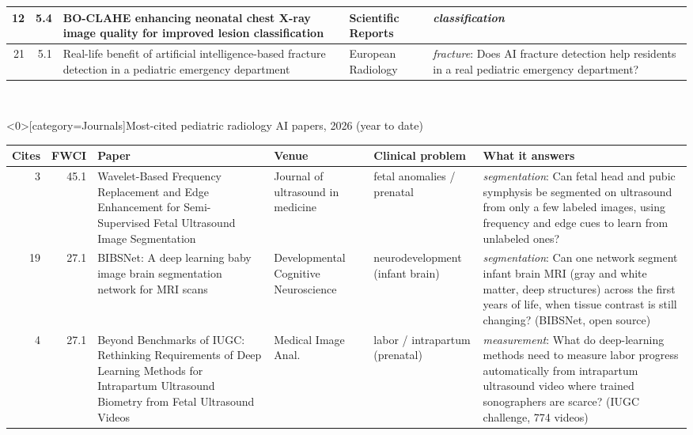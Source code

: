 \documentclass[aspectratio=169]{beamer}
\renewcommand{\arraystretch}{1.08}
\begin{document}
\begin{frame}
\begin{adjustbox}{max totalsize={\textwidth}{0.64\textheight}}
\begin{tabular}{|r|r|>{\raggedright\arraybackslash}p{}|>{\raggedright\arraybackslash}p{}|>{\raggedright\arraybackslash}p{}|}
12 & 5.4 & BO-CLAHE enhancing neonatal chest X-ray image quality for improved lesion classification & Scientific Reports & \textit{classification} \\ \hline
21 & 5.1 & Real-life benefit of artificial intelligence-based fracture detection in a pediatric emergency department & European Radiology & \textit{fracture}: Does AI fracture detection help residents in a real pediatric emergency department? \\ \hline
\end{tabular}
\end{adjustbox}
\\[1pt]
{\tiny }
\end{frame}

\begin{frame}<0>[category=Journals]{Most-cited pediatric radiology AI papers, 2026 (year to date)}
\tiny
\begin{adjustbox}{max totalsize={\textwidth}{0.74\textheight}}
\renewcommand{\arraystretch}{1.2}
\begin{tabular}{|r|r|>{\raggedright\arraybackslash}p{}|>{\raggedright\arraybackslash}p{}|>{\raggedright\arraybackslash}p{}|>{\raggedright\arraybackslash}p{}|}
\hline \textbf{Cites} & \textbf{FWCI} & \textbf{Paper} & \textbf{Venue} & \textbf{Clinical problem} & \textbf{What it answers} \\ \hline
3 & 45.1 & Wavelet-Based Frequency Replacement and Edge Enhancement for Semi-Supervised Fetal Ultrasound Image Segmentation & Journal of ultrasound in medicine & fetal anomalies / prenatal & \textit{segmentation}: Can fetal head and pubic symphysis be segmented on ultrasound from only a few labeled images, using frequency and edge cues to learn from unlabeled ones? \\ \hline
19 & 27.1 & BIBSNet: A deep learning baby image brain segmentation network for MRI scans & Developmental Cognitive Neuroscience & neurodevelopment (infant brain) & \textit{segmentation}: Can one network segment infant brain MRI (gray and white matter, deep structures) across the first years of life, when tissue contrast is still changing? (BIBSNet, open source) \\ \hline
4 & 27.1 & Beyond Benchmarks of IUGC: Rethinking Requirements of Deep Learning Methods for Intrapartum Ultrasound Biometry from Fetal Ultrasound Videos & Medical Image Anal. & labor / intrapartum (prenatal) & \textit{measurement}: What do deep-learning methods need to measure labor progress automatically from intrapartum ultrasound video where trained sonographers are scarce? (IUGC challenge, 774 videos) \\ \hline

\end{tabular}
\end{adjustbox}
\end{frame}
\end{document}
